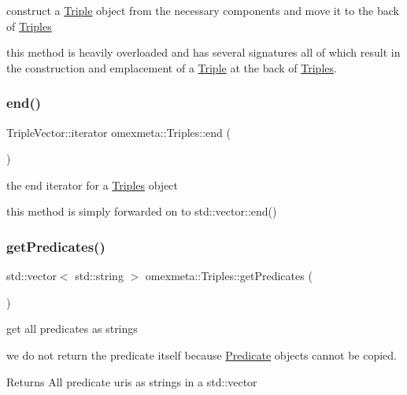 construct a \hyperlink{classomexmeta_1_1Triple}{Triple} object from the necessary components and move it to the back of \hyperlink{classomexmeta_1_1Triples}{Triples} 

this method is heavily overloaded and has several signatures all of which result in the construction and emplacement of a \hyperlink{classomexmeta_1_1Triple}{Triple} at the back of \hyperlink{classomexmeta_1_1Triples}{Triples}. \mbox{\label{classomexmeta_1_1Triples_a4312337b242280bcb119908c0334bfd8}} 
\subsubsection{\texorpdfstring{end()}{end()}}
{\footnotesize\ttfamily Triple\+Vector\+::iterator omexmeta\+::\+Triples\+::end (\begin{DoxyParamCaption}{ }\end{DoxyParamCaption})}



the end iterator for a \hyperlink{classomexmeta_1_1Triples}{Triples} object 

this method is simply forwarded on to std\+::vector\+::end() \mbox{\label{classomexmeta_1_1Triples_a63639c08caac19e6c5cbf30bb28292d0}} 
\subsubsection{\texorpdfstring{get\+Predicates()}{getPredicates()}}
{\footnotesize\ttfamily std\+::vector$<$ std\+::string $>$ omexmeta\+::\+Triples\+::get\+Predicates (\begin{DoxyParamCaption}{ }\end{DoxyParamCaption})}



get all predicates as strings 

we do not return the predicate itself because \hyperlink{classomexmeta_1_1Predicate}{Predicate} objects cannot be copied. \begin{DoxyReturn}{Returns}
All predicate uri\textquotesingle{}s as strings in a std\+::vector 
\end{DoxyReturn}
\mbox{\label{classomexmeta_1_1Triples_aa875120a73cb1618be9e699e8bfb08c4}} 
